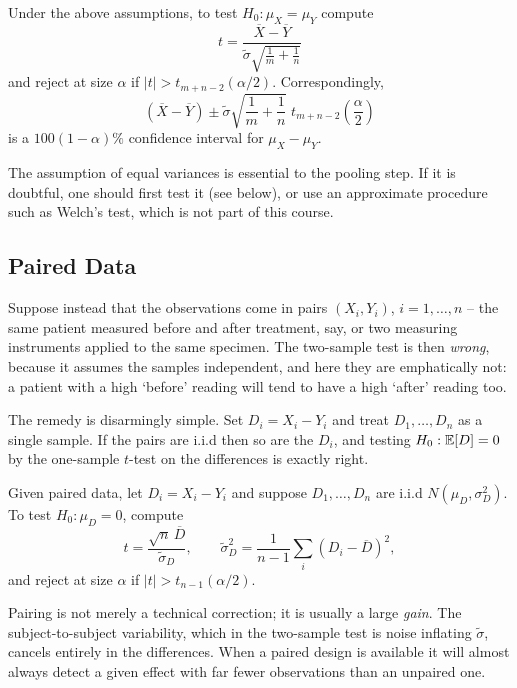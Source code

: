 \documentclass[a4paper]{scrartcl}
\begin{document}
\begin{definition}
  Under the above assumptions, to test $H_0 : \mu_X = \mu_Y$ compute
  $$
  t = \frac{\overline{X}-\overline{Y}}{\tilde\sigma\sqrt{\frac 1m+\frac 1n}}
  $$
  and reject at size $\alpha$ if $|t| > t_{m+n-2}(\alpha/2)$. Correspondingly,
  $$
  \left(\overline{X}-\overline{Y}\right) \pm \tilde\sigma\sqrt{\frac 1m + \frac 1n}\;t_{m+n-2}\!\left(\frac{\alpha}{2}\right)
  $$
  is a $100(1-\alpha)\%$ confidence interval for $\mu_X-\mu_Y$.
\end{definition}

The assumption of equal variances is essential to the pooling step. If it is doubtful, one should first test it (see below), or use an approximate procedure such as Welch's test, which is not part of this course.

\subsection{Paired Data}

Suppose instead that the observations come in pairs $(X_i, Y_i)$, $i = 1,\dots,n$ -- the same patient measured before and after treatment, say, or two measuring instruments applied to the same specimen. The two-sample test is then \emph{wrong}, because it assumes the samples independent, and here they are emphatically not: a patient with a high `before' reading will tend to have a high `after' reading too.

The remedy is disarmingly simple. Set $D_i = X_i - Y_i$ and treat $D_1,\dots,D_n$ as a single sample. If the pairs are i.i.d then so are the $D_i$, and testing $H_0 : \mathbb{E}[D] = 0$ by the one-sample $t$-test on the differences is exactly right.

\begin{definition}
  Given paired data, let $D_i = X_i - Y_i$ and suppose $D_1,\dots,D_n$ are i.i.d $N(\mu_D,\sigma_D^2)$. To test $H_0 : \mu_D = 0$, compute
  $$
  t = \frac{\sqrt n\,\overline{D}}{\tilde\sigma_D}, \qquad \tilde\sigma_D^2 = \frac{1}{n-1}\sum_i\left(D_i - \overline{D}\right)^2,
  $$
  and reject at size $\alpha$ if $|t| > t_{n-1}(\alpha/2)$.
\end{definition}

Pairing is not merely a technical correction; it is usually a large \emph{gain}. The subject-to-subject variability, which in the two-sample test is noise inflating $\tilde\sigma$, cancels entirely in the differences. When a paired design is available it will almost always detect a given effect with far fewer observations than an unpaired one.
\end{document}
